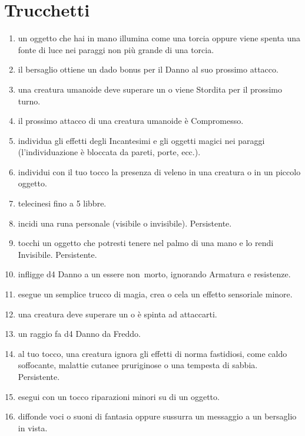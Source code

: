 \documentclass[itdr]{subfiles}
\begin{document}
\section{Trucchetti}
\def \spellcircle {T}
\begin{enumerate}
	\item {} un oggetto che hai in mano illumina come una torcia oppure viene spenta una fonte di luce nei paraggi non più grande di una torcia.
	\item {} il bersaglio ottiene un dado bonus per il Danno al suo prossimo attacco.
	\item {} una creatura umanoide deve superare un  o viene Stordita per il prossimo turno.
	\item {} il prossimo attacco di una creatura umanoide è Compromesso.
	\item {} individua gli effetti degli Incantesimi e gli oggetti magici nei paraggi (l’individuazione è bloccata da pareti, porte, ecc.).
	\item {} individui con il tuo tocco la presenza di veleno in una creatura o in un piccolo oggetto.
	\item {} telecinesi fino a 5 libbre.
	\item {} incidi una runa personale (visibile o invisibile). Persistente.
	\item {} tocchi un oggetto che potresti tenere nel palmo di una mano e lo rendi Invisibile. Persistente.
	\item {} infligge d4 Danno a un essere \mbox{non morto}, ignorando Armatura e resistenze.
	\item {} esegue un semplice trucco di magia, crea o cela un effetto sensoriale minore.
	\item {} una creatura deve superare un  o è spinta ad attaccarti.
	\item {} un raggio fa d4 Danno da Freddo.
	\item {} al tuo tocco, una creatura ignora gli effetti di norma fastidiosi, come caldo soffocante, malattie cutanee pruriginose o una tempesta di sabbia. Persistente.
	\item {} esegui con un tocco riparazioni minori su di un oggetto.
	\item {} diffonde voci o suoni di fantasia oppure sussurra un messaggio a un bersaglio in vista.

\end{enumerate}
\end{document}
